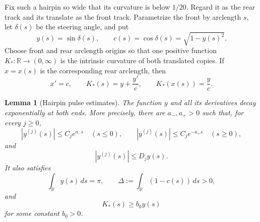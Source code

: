 \documentclass[11pt]{article}
\newtheorem{lemma}[theorem]{Lemma}
\theoremstyle{remark}
\newcommand{\R}{\mathbb R}
\begin{document}
Fix such a hairpin so wide that its curvature is below \(1/20\).  Regard it
as the rear track and its translate as the front track.  Parametrize
the front by arclength $s$, let $\delta(s)$ be the steering angle, and put
\begin{equation}\label{eq:yc}
  y(s)=\sin\delta(s),
  \qquad
  c(s)=\cos\delta(s)=\sqrt{1-y(s)^2}.
\end{equation}
Choose front and rear arclength origins so that one positive function
$K_*:\R\to(0,\infty)$ is the intrinsic curvature of both translated copies.
If $x=x(s)$ is the corresponding rear arclength, then
\begin{equation}\label{eq:isolated-identities}
  x'=c,
  \qquad
  K_*(s)=y+\frac{y'}c,
  \qquad
  K_*(x(s))=\frac yc.
\end{equation}

\begin{lemma}[Hairpin pulse estimates]\label{lem:pulse}
The function \(y\) and all its derivatives decay exponentially at both
ends.  More precisely, there are \(a_-,a_+>0\) such
that, for every \(j\geq0\),
\[
  |y^{(j)}(s)|\leq C_j e^{a_-s}\quad(s\leq0),
  \qquad
  |y^{(j)}(s)|\leq C_j e^{-a_+s}\quad(s\geq0),
\]
and
\begin{equation}\label{eq:relative-y-derivatives}
   |y^{(j)}(s)|\leq D_jy(s).
\end{equation}
It also satisfies
\begin{equation}\label{eq:mass-defect}
   \int_{\R}y(s)\,ds=\pi,
   \qquad
   \Delta:=\int_{\R}(1-c(s))\,ds>0,
\end{equation}
and
\begin{equation}\label{eq:Kstar-lower}
   K_*(s)\geq b_0y(s)
\end{equation}
for some constant \(b_0>0\).
\end{lemma}
\end{document}
